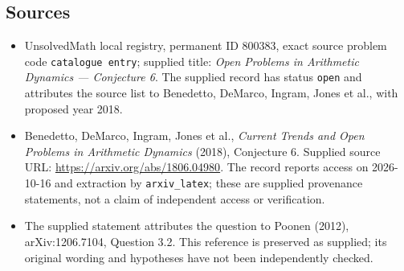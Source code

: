 \documentclass[11pt]{article}
\begin{document}
\subsection{Sources}
\begin{itemize}
\item UnsolvedMath local registry, permanent ID \(800383\), exact source problem code \texttt{catalogue entry}; supplied title: \emph{Open Problems in Arithmetic Dynamics --- Conjecture 6}. The supplied record has status \texttt{open} and attributes the source list to Benedetto, DeMarco, Ingram, Jones et al., with proposed year 2018.
\item Benedetto, DeMarco, Ingram, Jones et al., \emph{Current Trends and Open Problems in Arithmetic Dynamics} (2018), Conjecture 6. Supplied source URL: \url{https://arxiv.org/abs/1806.04980}. The record reports access on 2026-10-16 and extraction by \texttt{arxiv\_latex}; these are supplied provenance statements, not a claim of independent access or verification.
\item The supplied statement attributes the question to Poonen (2012), arXiv:1206.7104, Question 3.2. This reference is preserved as supplied; its original wording and hypotheses have not been independently checked.
\end{itemize}
\end{document}
